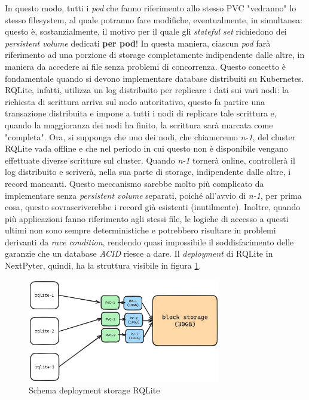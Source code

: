 In questo modo, tutti i \textit{pod} che fanno riferimento allo stesso PVC "vedranno" lo stesso filesystem, al quale potranno fare modifiche, eventualmente, in simultanea: questo è, sostanzialmente, il motivo per il quale gli \textit{stateful set} richiedono dei \textit{persistent volume} dedicati \textbf{per pod}! In questa maniera, ciascun \textit{pod} farà riferimento ad una porzione di storage completamente indipendente dalle altre, in maniera da accedere ai file senza problemi di concorrenza. Questo concetto è fondamentale quando si devono implementare database distribuiti su Kubernetes. RQLite, infatti, utilizza un log distribuito per replicare i dati sui vari nodi: la richiesta di scrittura arriva sul nodo autoritativo, questo fa partire una transazione distribuita e impone a tutti i nodi di replicare tale scrittura e, quando la maggioranza dei nodi ha finito, la scrittura sarà marcata come "completa". Ora, si supponga che uno dei nodi, che chiameremo \textit{n-1}, del cluster RQLite vada offline e che nel periodo in cui questo non è disponibile vengano effettuate diverse scritture sul cluster. Quando \textit{n-1} tornerà online, controllerà il log distribuito e scriverà, nella sua parte di storage, indipendente dalle altre, i record mancanti.
\newline
Questo meccanismo sarebbe molto più complicato da implementare senza \textit{persistent volume} separati, poiché all'avvio di \textit{n-1}, per prima cosa, questo sovrascriverebbe i record già esistenti (inutilmente). Inoltre, quando più applicazioni fanno riferimento agli stessi file, le logiche di accesso a questi ultimi non sono sempre deterministiche e potrebbero risultare in problemi derivanti da \textit{race condition}, rendendo quasi impossibile il soddisfacimento delle garanzie che un database \textit{ACID} riesce a dare. 
\newline
Il \textit{deployment} di RQLite in NextPyter, quindi, ha la struttura visibile in figura \ref{fig:rqlite-storage-deployment}.
\begin{figure}[h]
    \centering
    \includegraphics[width=0.75\textwidth]{files/images/rqlite-deployment.png}
    \caption{Schema deployment storage RQLite}
    \label{fig:rqlite-storage-deployment}
\end{figure}
